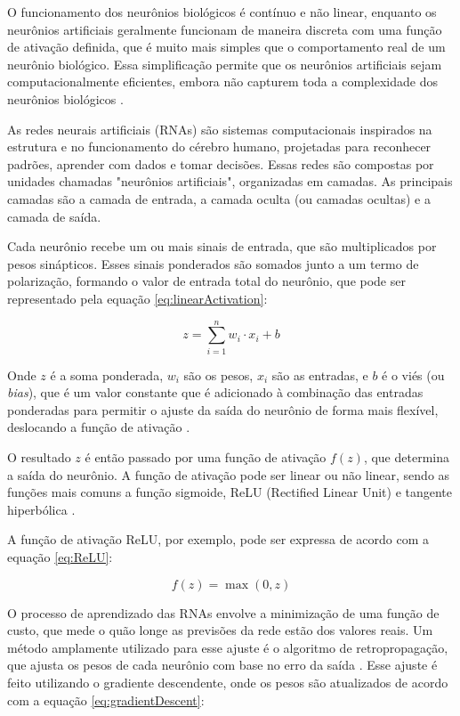 O funcionamento dos neurônios biológicos é contínuo e não linear, enquanto os neurônios artificiais geralmente funcionam de maneira discreta com uma função de ativação definida, que é muito mais simples que o comportamento real de um neurônio biológico. Essa simplificação permite que os neurônios artificiais sejam computacionalmente eficientes, embora não capturem toda a complexidade dos neurônios biológicos \cite{goodfellow2016deep}.

As redes neurais artificiais (RNAs) são sistemas computacionais inspirados na estrutura e no funcionamento do cérebro humano, projetadas para reconhecer padrões, aprender com dados e tomar decisões. Essas redes são compostas por unidades chamadas "neurônios artificiais", organizadas em camadas. As principais camadas são a camada de entrada, a camada oculta (ou camadas ocultas) e a camada de saída.

Cada neurônio recebe um ou mais sinais de entrada, que são multiplicados por pesos sinápticos. Esses sinais ponderados são somados junto a um termo de polarização, formando o valor de entrada total do neurônio, que pode ser representado pela equação \eqref{eq:linearActivation}:

\begin{equation}
    z = \sum_{i=1}^{n} w_i \cdot x_i + b
    \label{eq:linearActivation}
\end{equation}

Onde $z$ é a soma ponderada, $w_i$ são os pesos, $x_i$ são as entradas, e $b$ é o viés (ou \textit{bias}), que é um valor constante que é adicionado à combinação das entradas ponderadas para permitir o ajuste da saída do neurônio de forma mais flexível, deslocando a função de ativação \cite{goodfellow2016deep}.

O resultado $z$ é então passado por uma função de ativação $f(z)$, que determina a saída do neurônio. A função de ativação pode ser linear ou não linear, sendo as funções mais comuns a função sigmoide, ReLU (Rectified Linear Unit) e tangente hiperbólica \cite{haykin2008neural}.

A função de ativação ReLU, por exemplo, pode ser expressa de acordo com a equação \eqref{eq:ReLU}:

\begin{equation}
    f(z) = \max(0, z)
    \label{eq:ReLU}
\end{equation}

O processo de aprendizado das RNAs envolve a minimização de uma função de custo, que mede o quão longe as previsões da rede estão dos valores reais. Um método amplamente utilizado para esse ajuste é o algoritmo de retropropagação, que ajusta os pesos de cada neurônio com base no erro da saída \cite{rumelhart1986learning}. Esse ajuste é feito utilizando o gradiente descendente, onde os pesos são atualizados de acordo com a equação \eqref{eq:gradientDescent}:

